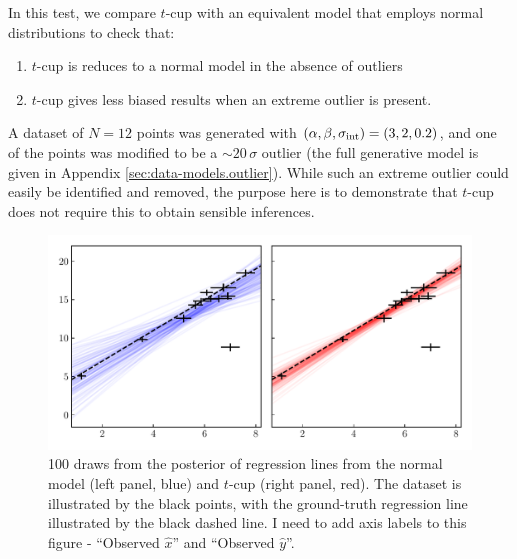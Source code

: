 \documentclass[fleqn,usenatbib]{rasti}
\begin{document}
In this test, we compare $t$-cup with an equivalent model that employs normal
distributions to check that:
\begin{enumerate}
    \item $t$-cup is reduces to a normal model in the absence of outliers
    \item $t$-cup gives less biased results when an extreme outlier is          present.
\end{enumerate}
A dataset of $N = 12$ points was generated with $(\alpha, \beta, \sigma_{\rm
int}) = (3, 2, 0.2)$, and one of the points was modified to be a
$\sim20\,\sigma$ outlier (the full generative model is given in Appendix
\ref{sec:data-models.outlier}). While such an extreme outlier could easily be
identified and removed, the purpose here is to demonstrate that $t$-cup does not
require this to obtain sensible inferences.

\begin{figure}
    \includegraphics[width=\linewidth]{graphics/fixed/regression_outlier.pdf}
    \caption{{\color{red} 100} draws from the posterior of regression lines from
    the normal model (left panel, blue) and $t$-cup (right panel, red). The
    dataset is illustrated by the black points, with the ground-truth regression
    line illustrated by the black dashed line. {\color{red} I need to add axis
    labels to this figure - ``Observed $\hat{x}$'' and ``Observed $\hat{y}$''.}}
    \label{fig:results.outlier.regression}
\end{figure}
\end{document}
